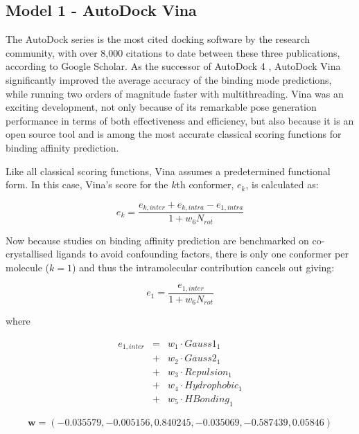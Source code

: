 \subsection{Model 1 - AutoDock Vina}

The AutoDock series \citep{597,596,595} is the most cited docking software by the research community, with over 8,000 citations to date between these three publications, according to Google Scholar. As the successor of AutoDock 4 \citep{596}, AutoDock Vina \citep{595} significantly improved the average accuracy of the binding mode predictions, while running two orders of magnitude faster with multithreading. Vina was an exciting development, not only because of its remarkable pose generation performance in terms of both effectiveness and efficiency, but also because it is an open source tool and is among the most accurate classical scoring functions for binding affinity prediction.

Like all classical scoring functions, Vina assumes a predetermined functional form. In this case, Vina's score for the $k$th conformer, $e_k$, is calculated as:

\begin{equation}
\label{rfscore3:e_k}
e_k=\frac{e_{k,inter}+e_{k,intra}-e_{1,intra}}{1+w_6N_{rot}}
\end{equation}

Now because studies on binding affinity prediction are benchmarked on co-crystallised ligands to avoid confounding factors, there is only one conformer per molecule ($k=1$) and thus the intramolecular contribution cancels out giving:

\begin{equation}
\label{rfscore3:e_1}
e_1=\frac{e_{1,inter}}{1+w_6N_{rot}}
\end{equation}

where

\begin{eqnarray}
\label{rfscore3:e_1_inter}
e_{1,inter} &=& w_1 \cdot Gauss1_1 \nonumber \\
            &+& w_2 \cdot Gauss2_1 \nonumber \\
		    &+& w_3 \cdot Repulsion_1 \nonumber \\
		    &+& w_4 \cdot Hydrophobic_1 \nonumber \\
		    &+& w_5 \cdot HBonding_1
\end{eqnarray}

\begin{equation}
\label{rfscore3:w}
\mathbf w=(-0.035579,-0.005156,0.840245,-0.035069,-0.587439,0.05846)
\end{equation}

